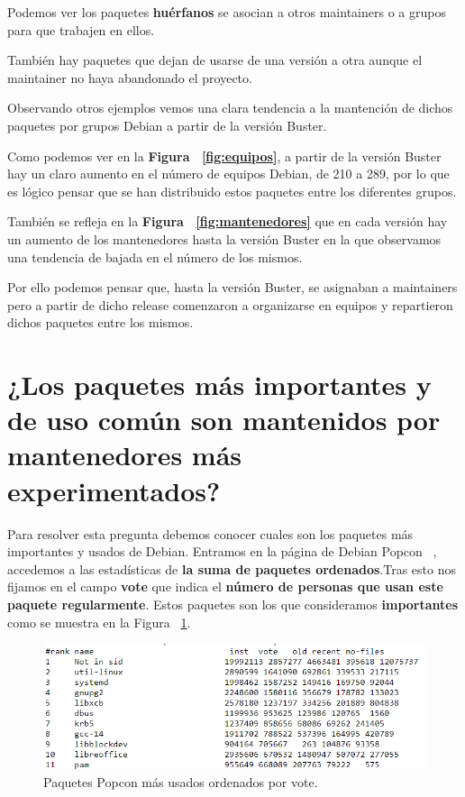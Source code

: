 \documentclass[a4paper, 12pt]{book}
\begin{document}
Podemos ver los paquetes \textbf{huérfanos} se asocian a otros maintainers o a grupos para que trabajen en ellos. 

También hay paquetes que dejan de usarse de una versión a otra aunque el maintainer no haya abandonado el proyecto.

Observando otros ejemplos vemos una clara tendencia a la mantención de dichos paquetes por grupos Debian a partir de la versión Buster.

Como podemos ver en la \textbf{Figura ~\ref{fig:equipos}}, a partir de la versión Buster hay un claro aumento en el número de equipos Debian, de 210 a 289, por lo que es lógico pensar que se han distribuido estos paquetes entre los diferentes grupos.

También se refleja en la \textbf{Figura ~\ref{fig:mantenedores}} que en cada versión hay un aumento de los mantenedores hasta la versión Buster en la que observamos una tendencia de bajada en el número de los mismos.

Por ello podemos pensar que, hasta la versión Buster, se asignaban a maintainers pero a partir de dicho release comenzaron a organizarse en equipos y repartieron dichos paquetes entre los mismos.


\section{¿Los paquetes más importantes y de uso común son mantenidos por mantenedores más experimentados?}
\label{sec:pregunta_6}

Para resolver esta pregunta debemos conocer cuales son los paquetes más importantes y usados de Debian. Entramos en la página de Debian Popcon ~\cite{debian:_popcon}, accedemos a las estadísticas de \textbf{la suma de paquetes ordenados}.Tras esto nos fijamos en el campo \textbf{vote} que indica el \textbf{número de personas que usan este paquete regularmente}. Estos paquetes son los que consideramos \textbf{importantes} como se muestra en la Figura ~\ref{fig:paquetes_popcon}.



\begin{figure}[h]
	\centering
	\includegraphics[width=18cm, keepaspectratio]{img/popcon.png}
	\caption{Paquetes Popcon más usados ordenados por vote.}
	\label{fig:paquetes_popcon}
\end{figure}
\end{document}
